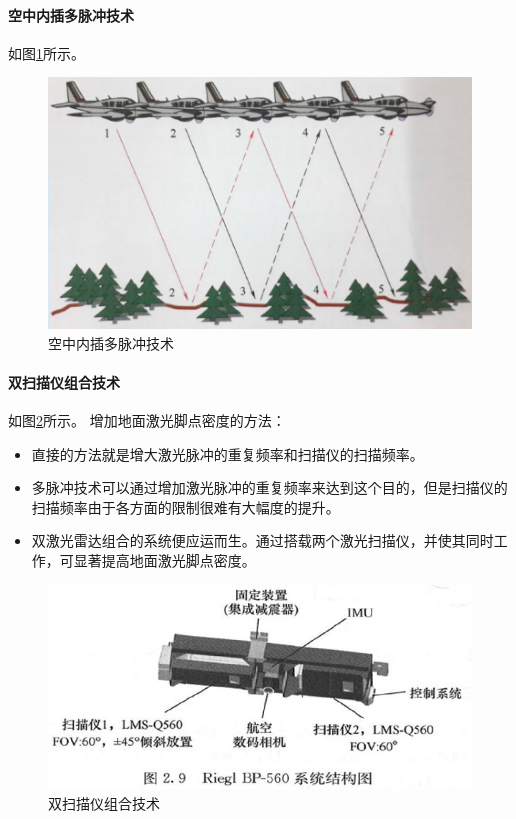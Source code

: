 \paragraph{空中内插多脉冲技术}如图\ref{fig:空中内插多脉冲技术}所示。
\begin{figure}[htbp]
	\centering
	\includegraphics[width=0.7\linewidth]{figure/Chapter3/空中内插多脉冲技术}
	\caption{空中内插多脉冲技术}
	\label{fig:空中内插多脉冲技术}
\end{figure}

\paragraph{双扫描仪组合技术}如图\ref{fig:双扫描仪组合技术}所示。
增加地面激光脚点密度的方法：
\begin{itemize}
	\item 直接的方法就是增大激光脉冲的重复频率和扫描仪的扫描频率。
	\item 多脉冲技术可以通过增加激光脉冲的重复频率来达到这个目的，但是扫描仪的扫描频率由于各方面的限制很难有大幅度的提升。
	\item 双激光雷达组合的系统便应运而生。通过搭载两个激光扫描仪，并使其同时工作，可显著提高地面激光脚点密度。
\end{itemize}

\begin{figure}[htbp]
	\centering
	\includegraphics[width=0.7\linewidth]{figure/Chapter3/双扫描仪组合技术}
	\caption{双扫描仪组合技术}
	\label{fig:双扫描仪组合技术}
\end{figure}